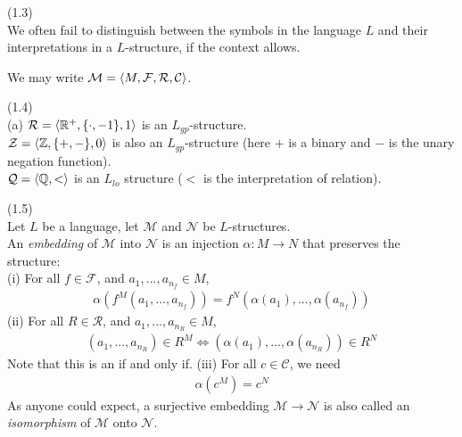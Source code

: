 \documentclass[a4paper]{article}
\begin{document}
\begin{notation} (1.3)\\
We often fail to distinguish between the symbols in the language $L$ and their interpretations in a $L$-structure, if the context allows.

We may write $\mathcal{M} = \langle M,\mathcal{F},\mathcal{R},\mathcal{C}\rangle$.
\end{notation}

\begin{eg} (1.4)\\
(a) $\mathcal{R} = \langle\mathbb{R}^+,\{\cdot,-1\},1\rangle$ is an $L_{gp}$-structure.\\
$\mathcal{Z} = \langle\mathbb{Z},\{+,-\},0\rangle$ is also an $L_{gp}$-structure (here $+$ is a binary and $-$ is the unary negation function).\\
$\mathcal{Q} = \langle\mathbb{Q},<\rangle$ is an $L_{lo}$ structure ($<$ is the interpretation of relation).
\end{eg}

\begin{defi} (1.5)\\
Let $L$ be a language, let $\mathcal{M}$ and $\mathcal{N}$ be $L$-structures.\\
An \emph{embedding} of $\mathcal{M}$ into $\mathcal{N}$ is an injection $\alpha:M \to N$ that preserves the structure:\\
(i) For all $f \in \mathcal{F}$, and $a_1,...,a_{n_f} \in M$,
\begin{equation*}
\begin{aligned}
\alpha(f^M(a_1,...,a_{n_f})) = f^N(\alpha(a_1),...,\alpha(a_{n_f}))
\end{aligned}
\end{equation*}
(ii) For all $R \in \mathcal{R}$, and $a_1,...,a_{n_R} \in M$,
\begin{equation*}
\begin{aligned}
(a_1,...,a_{n_R}) \in R^M \iff (\alpha(a_1),...,\alpha(a_{n_R})) \in R^N
\end{aligned}
\end{equation*}
Note that this is an if and only if.
(iii) For all $c \in \mathcal{C}$, we need 
\begin{equation*}
\begin{aligned}
\alpha(c^M) = c^N
\end{aligned}
\end{equation*}
As anyone could expect, a surjective embedding $\mathcal{M} \to \mathcal{N}$ is also called an \emph{isomorphism} of $\mathcal{M}$ onto $\mathcal{N}$.
\end{defi}
\end{document}

